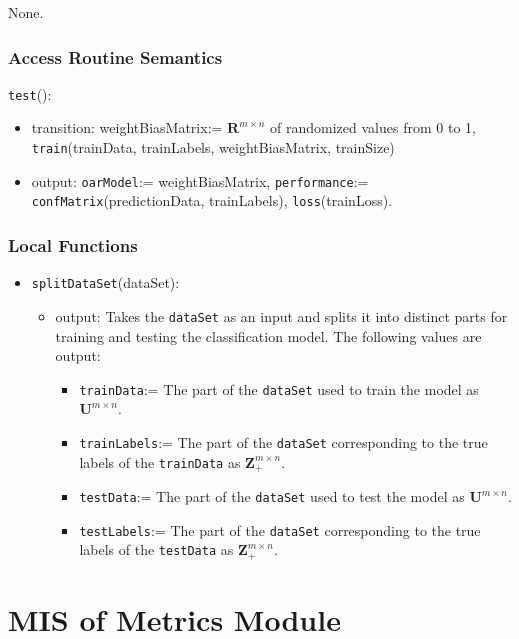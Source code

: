\documentclass[12pt, titlepage]{article}
\def\code#1{\texttt{#1}}
\begin{document}
None.

\subsubsection{Access Routine Semantics}

\noindent \code{test}():
\begin{itemize}
\item transition: weightBiasMatrix:= $\mathbf{R}^{m \times n}$ of randomized values from 0 to 1, \code{train}(trainData, trainLabels, weightBiasMatrix, trainSize)
\item output: \code{oarModel}:= weightBiasMatrix, \code{performance}:= \code{confMatrix}(predictionData, trainLabels), \code{loss}(trainLoss).
\end{itemize}

\subsubsection{Local Functions}

\begin{itemize}
\item \code{splitDataSet}(dataSet):
  \begin{itemize}
    \item output: Takes the \code{dataSet} as an input and splits it into distinct parts for training and testing the classification model.
    The following values are output:
    \begin{itemize}
      \item \code{trainData}:= The part of the \code{dataSet} used to train the model as $\mathbf{U}^{m \times n}$.
      \item \code{trainLabels}:= The part of the \code{dataSet} corresponding to the true labels of the \code{trainData} as $\mathbf{Z}_{+}^{m \times n}$.
      \item \code{testData}:= The part of the \code{dataSet} used to test the model as $\mathbf{U}^{m \times n}$.
      \item \code{testLabels}:= The part of the \code{dataSet} corresponding to the true labels of the \code{testData} as $\mathbf{Z}_{+}^{m \times n}$.
    \end{itemize}
  \end{itemize}
\end{itemize}

\section{MIS of Metrics Module} \label{ModuleCM} 
\end{document}
